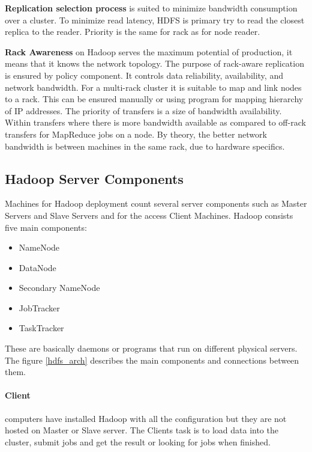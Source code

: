 \documentclass[a4paper,12pt,oneside]{report}
\begin{document}
	\textbf{Replication selection process} is suited to minimize bandwidth
	consumption over a cluster. 
	To minimize read latency, HDFS is primary try to read the closest replica to the
	reader. Priority is the 
	same for rack as for node reader. \cite{hadoop_hdfs_web}
	
	\textbf{Rack Awareness} on Hadoop serves the maximum potential of production, 
	it means that it knows the network topology. The purpose of rack-aware
	replication is ensured by policy 
	component. It controls data reliability, availability, and network bandwidth.
	For a multi-rack cluster it is suitable to map and link
	nodes to a rack\cite{hadoop_rack_web}. This can be ensured manually or using
	program for mapping hierarchy of IP 
	addresses. The priority of transfers is a size of bandwidth availability. Within
	transfers 
	where there is more bandwidth available as compared to off-rack transfers for
	MapReduce jobs on a node. 
	By theory, the better network bandwidth is between machines in the same rack,
	due to hardware specifics.
	
	\subsection{Hadoop Server Components}
	Machines for Hadoop deployment count several server components such as Master
	Servers and Slave Servers and for the access Client Machines.  Hadoop consists
	five main components: 
	\begin{itemize}[noitemsep]
		\item NameNode
		\item DataNode
		\item Secondary NameNode
		\item JobTracker
		\item TaskTracker
	\end{itemize}
	These are basically daemons or programs that run on different physical servers.
	The figure \ref{hdfs_arch} describes the main components and connections
	between them.
	
	\paragraph{Client}
	computers have installed Hadoop with  all the configuration but they are not
	hosted on Master or Slave 
	server. The Clients task is to  load data into the cluster, submit jobs and get
	the result or looking for jobs when finished.
	
\end{document}
